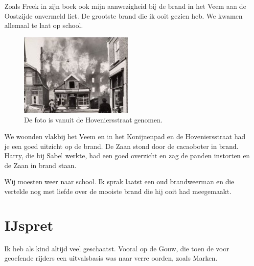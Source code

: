 \documentclass[12pt,twoside]{memoir}
\begin{document}
Zoals Freek in zijn boek ook mijn aanwezigheid bij de brand in het Veem aan de Oostzijde onvermeld liet. De grootste brand die ik ooit gezien heb. We kwamen allemaal te laat op school. 

\begin{figure}
\includegraphics[width=\textwidth]{img/ch12/vuur}
\caption*{\footnotesize De foto is vanuit de Hoveniersstraat genomen.}
\end{figure}

We woonden vlakbij het Veem en in het Konijnenpad en de Hoveniersstraat had je een goed uitzicht op de brand. De Zaan stond door de cacaoboter in brand. Harry, die bij Sabel werkte, had een goed overzicht en zag de panden instorten en de Zaan in brand staan.

Wij moesten weer naar school. Ik sprak laatst een oud brandweerman en die vertelde nog met liefde over de mooiste brand die hij ooit had meegemaakt. 

\chapter{IJspret} %
\label{cha:ijspret}

Ik heb als kind altijd veel geschaatst. Vooral op de Gouw, die toen de voor geoefende rijders een uitvalsbasis was naar verre oorden, zoals Marken.
\end{document}
